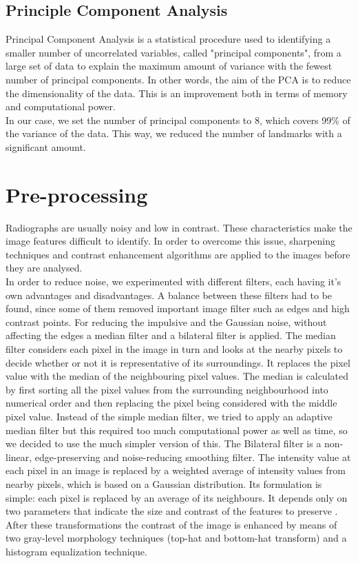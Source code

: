 \documentclass[a4paper]{article}
\begin{document}
\subsection{Principle Component Analysis}

Principal Component Analysis is a statistical procedure used to identifying a smaller number of uncorrelated variables, called "principal components", from a large set of data to explain the maximum amount of variance with the fewest number of principal components. In other words, the aim of the PCA is to reduce the dimensionality of the data. This is an improvement both in terms of memory and computational power.\\
In our case, we set the number of principal components to 8, which covers 99\% of the variance of the data. This way, we reduced the number of landmarks with a significant amount.

\section{Pre-processing}
Radiographs are usually noisy and low in contrast. These characteristics make the image features difficult to identify. In order to overcome this issue, sharpening techniques and contrast enhancement algorithms are applied to the images before they are analysed. \\
In order to reduce noise, we experimented with different filters, each having it's own advantages and disadvantages.  A balance between these filters had to be found, since some of them removed important image filter such as edges and high contrast points. For reducing the impulsive and the Gaussian noise, without affecting the edges a median filter and a bilateral filter is applied. The median filter considers each pixel in the image in turn and looks at the nearby pixels to decide whether or not it is representative of its surroundings. It replaces the pixel value with the median of the neighbouring pixel values. The median is calculated by first sorting all the pixel values from the surrounding neighbourhood into numerical order and then replacing the pixel being considered with the middle pixel value.  Instead of the simple median filter, we tried to apply an adaptive median filter but this required too much computational power as well as time, so we decided to use the much simpler version of this. The Bilateral filter  is a non-linear, edge-preserving and noise-reducing smoothing filter. The intensity value at each pixel in an image is replaced by a weighted average of intensity values from nearby pixels, which is based on a Gaussian distribution. Its formulation is simple: each pixel is replaced by an average of its neighbours. It depends only on two parameters that indicate the size and contrast of the features to preserve \cite{paris}.\\
After these transformations the contrast of the image is enhanced by means of two gray-level morphology techniques (top-hat and bottom-hat transform) and a histogram equalization technique.  \\
\end{document}
